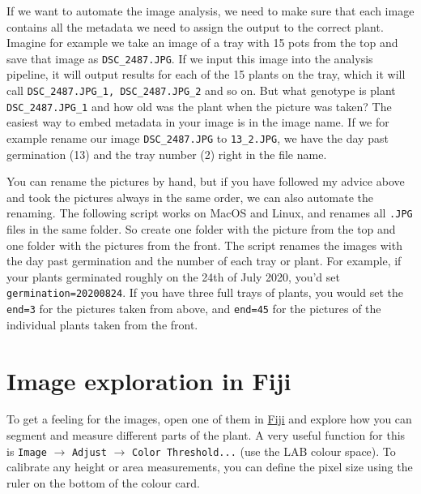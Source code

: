 \documentclass[10pt]{article}
\begin{document}
If we want to automate the image analysis, we need to make sure that each image contains all the metadata we need to assign the output to the correct plant. Imagine for example we take an image of a tray with 15 pots from the top and save that image as \texttt{DSC\_2487.JPG}. If we input this image into the analysis pipeline, it will output results for each of the 15 plants on the tray, which it will call \texttt{DSC\_2487.JPG\_1, DSC\_2487.JPG\_2} and so on. But what genotype is plant \texttt{DSC\_2487.JPG\_1} and how old was the plant when the picture was taken? The easiest way to embed metadata in your image is in the image name. If we for example rename our image \texttt{DSC\_2487.JPG} to \texttt{13\_2.JPG}, we have the day past germination (13) and the tray number (2) right in the file name. 

You can rename the pictures by hand, but if you have followed my advice above and took the pictures always in the same order, we can also automate the renaming. The following script works on MacOS and Linux, and renames all \texttt{.JPG} files in the same folder. So create one folder with the picture from the top and one folder with the pictures from the front. The script renames the images with the day past germination and the number of each tray or plant. For example, if your plants germinated roughly on the 24th of July 2020, you'd set \texttt{germination=20200824}. If you have three full trays of plants, you would set the \texttt{end=3}  for the pictures taken from above, and \texttt{end=45} for the pictures of the individual plants taken from the front.
 


\section{Image exploration in Fiji}

To get a feeling for the images, open one of them in \href{https://imagej.net/Fiji/Downloads}{Fiji} and explore how you can segment and measure different parts of the plant. A very useful function for this is \texttt{Image} $\rightarrow$ \texttt{Adjust} $\rightarrow$ \texttt{Color Threshold...} (use the LAB colour space). To calibrate any height or area measurements, you can define the pixel size using the ruler on the bottom of the colour card.
\end{document}
